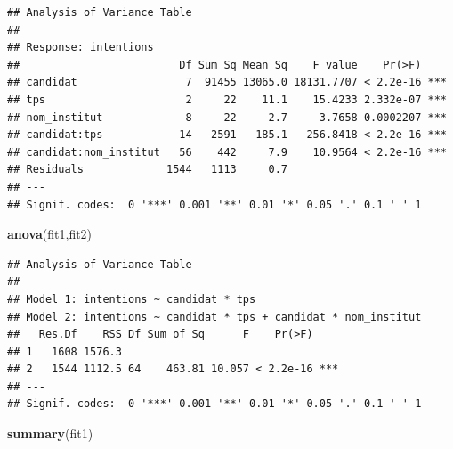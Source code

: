 \documentclass[
]{book}
\newenvironment{Shaded}{\begin{snugshade}}{\end{snugshade}}
\newcommand{\KeywordTok}[1]{\textcolor[rgb]{0.13,0.29,0.53}{\textbf{#1}}}
\newcommand{\NormalTok}[1]{#1}
\begin{document}
\begin{verbatim}
## Analysis of Variance Table
## 
## Response: intentions
##                         Df Sum Sq Mean Sq    F value    Pr(>F)    
## candidat                 7  91455 13065.0 18131.7707 < 2.2e-16 ***
## tps                      2     22    11.1    15.4233 2.332e-07 ***
## nom_institut             8     22     2.7     3.7658 0.0002207 ***
## candidat:tps            14   2591   185.1   256.8418 < 2.2e-16 ***
## candidat:nom_institut   56    442     7.9    10.9564 < 2.2e-16 ***
## Residuals             1544   1113     0.7                         
## ---
## Signif. codes:  0 '***' 0.001 '**' 0.01 '*' 0.05 '.' 0.1 ' ' 1
\end{verbatim}

\begin{Shaded}
\begin{Highlighting}[]
\KeywordTok{anova}\NormalTok{(fit1,fit2)}
\end{Highlighting}
\end{Shaded}

\begin{verbatim}
## Analysis of Variance Table
## 
## Model 1: intentions ~ candidat * tps
## Model 2: intentions ~ candidat * tps + candidat * nom_institut
##   Res.Df    RSS Df Sum of Sq      F    Pr(>F)    
## 1   1608 1576.3                                  
## 2   1544 1112.5 64    463.81 10.057 < 2.2e-16 ***
## ---
## Signif. codes:  0 '***' 0.001 '**' 0.01 '*' 0.05 '.' 0.1 ' ' 1
\end{verbatim}

\begin{Shaded}
\begin{Highlighting}[]
\KeywordTok{summary}\NormalTok{(fit1)}
\end{Highlighting}
\end{Shaded}
\end{document}
